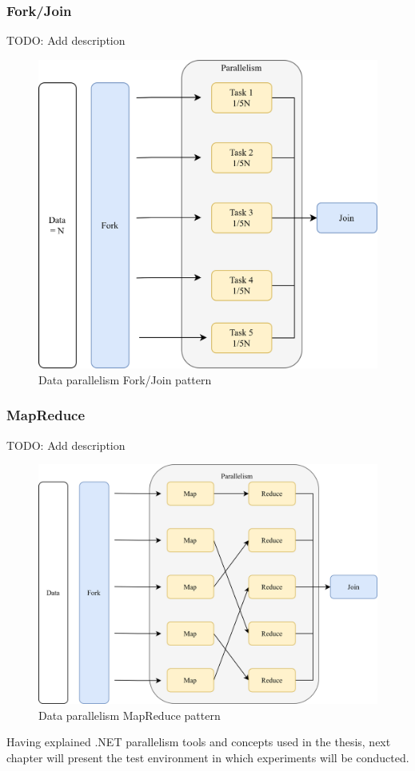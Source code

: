 \subsubsection{Fork/Join}
TODO: Add description
\begin{figure}[htb]
	\centering
		\includegraphics[scale=1.0]{figures02/forkjoin.png}
		\caption{Data parallelism Fork/Join pattern}
		\label{fig:ForkJoin}
\end{figure}

\subsubsection{MapReduce}
TODO: Add description
\begin{figure}[htb]
	\centering
		\includegraphics[scale=1.0]{figures02/mapreduce.png}
		\caption{Data parallelism MapReduce pattern}
		\label{fig:MapReduce}
\end{figure}

Having explained .NET parallelism tools and concepts used in the thesis, next chapter will present the test environment in which experiments will be conducted. 
